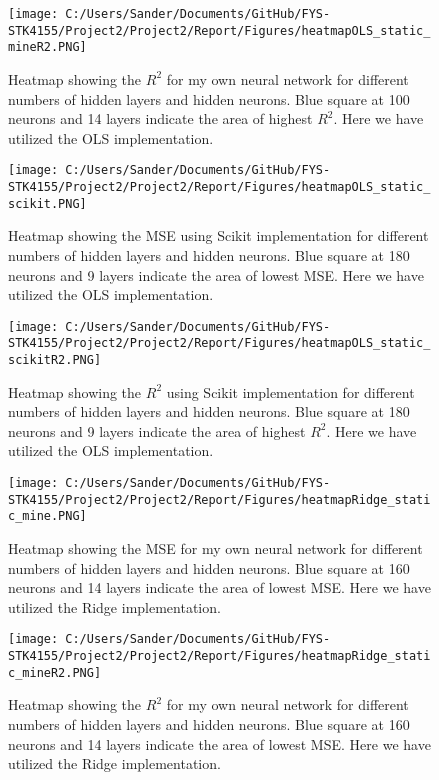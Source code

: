 \documentclass[12pt,a4paper]{article}
\begin{document}
\begin{figure}[H]
\centering
\texttt{[image: C:/Users/Sander/Documents/GitHub/FYS-STK4155/Project2/Project2/Report/Figures/heatmapOLS\_static\_mineR2.PNG]}
\caption{\label{fig:heatOLSR2} Heatmap showing the $R^2$ for my own neural network for different numbers of hidden layers and hidden neurons. Blue square at 100 neurons and 14 layers indicate the area of highest $R^2$. Here we have utilized the OLS implementation.}
\end{figure}

\begin{figure}[H]
\centering
\texttt{[image: C:/Users/Sander/Documents/GitHub/FYS-STK4155/Project2/Project2/Report/Figures/heatmapOLS\_static\_scikit.PNG]}
\caption{\label{fig:heatOLSsci} Heatmap showing the MSE using Scikit implementation for different numbers of hidden layers and hidden neurons. Blue square at 180 neurons and 9 layers indicate the area of lowest MSE. Here we have utilized the OLS implementation.}
\end{figure}

\begin{figure}[H]
\centering
\texttt{[image: C:/Users/Sander/Documents/GitHub/FYS-STK4155/Project2/Project2/Report/Figures/heatmapOLS\_static\_scikitR2.PNG]}
\caption{\label{fig:heatOLSsciR2} Heatmap showing the $R^2$ using Scikit implementation for different numbers of hidden layers and hidden neurons. Blue square at 180 neurons and 9 layers indicate the area of highest $R^2$. Here we have utilized the OLS implementation.}
\end{figure}

\begin{figure}[H]
\centering
\texttt{[image: C:/Users/Sander/Documents/GitHub/FYS-STK4155/Project2/Project2/Report/Figures/heatmapRidge\_static\_mine.PNG]}
\caption{\label{fig:heatRidge} Heatmap showing the MSE for my own neural network for different numbers of hidden layers and hidden neurons. Blue square at 160 neurons and 14 layers indicate the area of lowest MSE. Here we have utilized the Ridge implementation.}
\end{figure}

\begin{figure}[H]
\centering
\texttt{[image: C:/Users/Sander/Documents/GitHub/FYS-STK4155/Project2/Project2/Report/Figures/heatmapRidge\_static\_mineR2.PNG]}
\caption{\label{fig:heatRidgeR2} Heatmap showing the $R^2$ for my own neural network for different numbers of hidden layers and hidden neurons. Blue square at 160 neurons and 14 layers indicate the area of lowest MSE. Here we have utilized the Ridge implementation.}
\end{figure}
\end{document}
